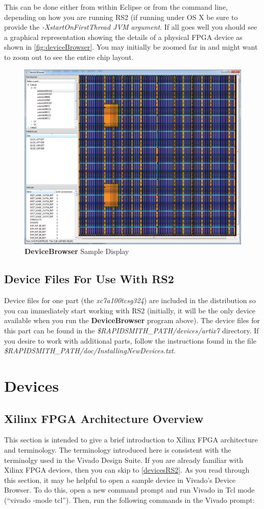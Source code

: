 \documentclass[10pt]{article}
\newcommand{\fil}[1]{{\em #1}}
\newcommand{\opt}[1]{{\em #1}}
\newcommand{\pgm}[1]{{\textbf{#1}}}
\newcommand{\dir}[1]{{\em #1}}
\begin{document}
\noindent This can be done either from within Eclipse or from the command line,
depending on how you are running RS2 (if running under OS X be sure to provide the
\opt{-XstartOnFirstThread JVM argument}. If all goes well you should see a
graphical representation showing the details of a physical FPGA device as shown
in \autoref{fig:deviceBrowser}.  You may initially be zoomed far in and might
want to zoom out to see the entire chip layout.

\begin{figure}[H]
\centering
\includegraphics[width=0.8\columnwidth]{deviceBrowser}
\caption{\pgm{DeviceBrowser} Sample Display}
\label{fig:deviceBrowser}
\end{figure}

\subsection{Device Files For Use With RS2}
Device files for one part (the {\em xc7a100tcsg324}) are included in the
distribution so you can immediately start working with RS2 (initially, it
will be the only device available when you run the \pgm{DeviceBrowser} program
above).  The device files for this part can be found in the
\dir{\${RAPIDSMITH\_PATH}/devices/artix7} directory. If you desire to work with
additional parts, follow the instructions found in the file
\fil{\$RAPIDSMITH\_PATH/\-doc/Installing\-NewDevices.txt}.

\clearpage
\section{Devices}

\subsection{Xilinx FPGA Architecture Overview} \label{fpgaArch}
This section is intended to give a brief introduction to Xilinx FPGA
architecture and terminology. The terminology introduced here is consistent
with the terminolgy used in the Vivado Design Suite. If you are already familiar
with Xilinx FPGA devices, then you can skip to \autoref{devicesRS2}. 
As you read through this section, it may be helpful to open a sample device in Vivado's
Device Browser. To do this, open a new command prompt and run Vivado in Tcl mode
(``vivado -mode tcl''). Then, run the following commands in the Vivado prompt:
\end{document}
